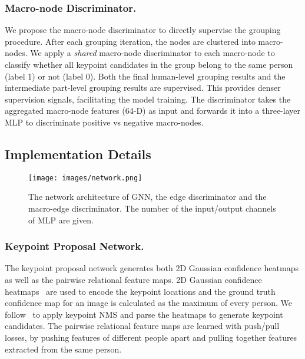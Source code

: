 \documentclass[runningheads]{llncs}
\begin{document}
	\subsubsection{Macro-node Discriminator.} 
	We propose the macro-node discriminator to directly supervise the grouping procedure. After each grouping iteration, the nodes are clustered into macro-nodes. We apply a \emph{shared} macro-node discriminator to each macro-node to classify whether all keypoint candidates in the group belong to the same person (label 1) or not (label 0). Both the final human-level grouping results and the intermediate part-level grouping results are supervised. This provides denser supervision signals, facilitating the model training. The discriminator takes the aggregated macro-node features (64-D) as input and forwards it into a three-layer MLP to discriminate positive vs negative macro-nodes.
	
	\subsection{Implementation Details}
	
	\begin{figure*}[t]
		\begin{center}
			\texttt{[image: images/network.png]}
		\end{center}
		\caption{The network architecture of GNN, the edge discriminator and the macro-edge discriminator. The number of the input/output channels of MLP are given.}
		\label{fig:network}
	\end{figure*}
	
	\subsubsection{Keypoint Proposal Network.}
	The keypoint proposal network generates both 2D Gaussian confidence heatmaps as well as the pairwise relational feature maps. 2D Gaussian confidence heatmaps~\cite{cao2017realtime,newell2017associative,nie2017generative} are used to encode the keypoint locations and the ground truth confidence map for an image is calculated as the maximum of every person. We follow~\cite{cao2017realtime,newell2017associative} to apply keypoint NMS and parse the heatmaps to generate keypoint candidates. The pairwise relational feature maps are learned with push/pull losses, by pushing features of different people apart and pulling together features extracted from the same person.
	
\end{document}
